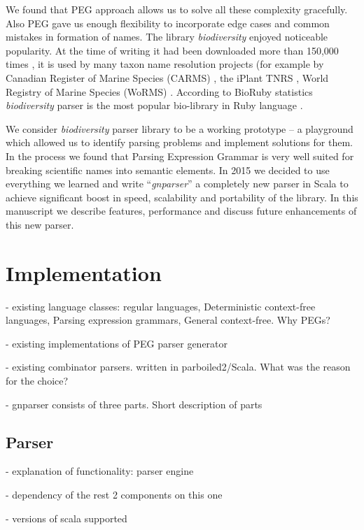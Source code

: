 \documentclass{bmcart}
\begin{document}
We found that PEG approach allows us to solve all these complexity gracefully.
Also PEG gave us enough flexibility to incorporate edge cases and common
mistakes in formation of names. The library \textit{biodiversity} enjoyed
noticeable popularity. At the time of writing it had been downloaded more than
150,000 times \cite{bdiv_downloads}, it is used by many taxon name resolution
projects (for example by Canadian Register of Marine Species (CARMS)
\cite{carms}, the iPlant TNRS \cite{iplant}, World Registry of Marine Species
(WoRMS) \cite{worms}.  According to BioRuby statistics \textit{biodiversity}
parser is the most popular bio-library in Ruby language \cite{biogems}.

We consider \textit{biodiversity} parser library to be a working prototype -- a
playground which allowed us to identify parsing problems and implement
solutions for them. In the process we found that Parsing Expression Grammar is
very well suited for breaking scientific names into semantic elements. In 2015
we decided to use everything we learned and write ``\textit{gnparser}'' a
completely new parser in Scala to achieve significant boost in speed,
scalability and portability of the library. In this manuscript we describe
features, performance and discuss future enhancements of this new parser.

\section*{Implementation}

- existing language classes: regular languages, Deterministic context-free languages, Parsing expression grammars, General context-free. Why PEGs?

- existing implementations of PEG parser generator %

- existing combinator parsers. written in parboiled2/Scala. What was the reason for the choice?

- gnparser consists of three parts. Short description of parts

\subsection*{Parser}

- explanation of functionality: parser engine

- dependency of the rest 2 components on this one

- versions of scala supported
\end{document}
